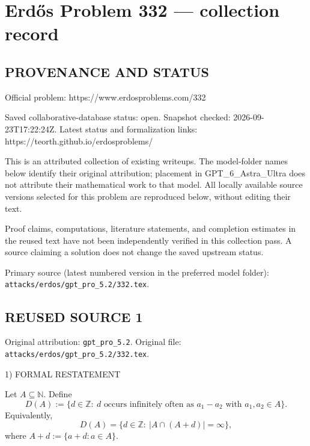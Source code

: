 \section*{Erd\H{o}s Problem 332 --- collection record}

\subsection*{PROVENANCE AND STATUS}
Official problem: https://www.erdosproblems.com/332

Saved collaborative-database status: open.
Snapshot checked: 2026-09-23T17:22:24Z.
Latest status and formalization links: https://teorth.github.io/erdosproblems/

This is an attributed collection of existing writeups. The model-folder names below identify their original attribution; placement in GPT\_6\_Astra\_Ultra does not attribute their mathematical work to that model. All locally available source versions selected for this problem are reproduced below, without editing their text.

Proof claims, computations, literature statements, and completion estimates in the reused text have not been independently verified in this collection pass. A source claiming a solution does not change the saved upstream status.

Primary source (latest numbered version in the preferred model folder): \texttt{attacks/erdos/gpt\_pro\_5.2/332.tex}.

\subsection*{REUSED SOURCE 1}
Original attribution: \texttt{gpt\_pro\_5.2}.
Original file: \texttt{attacks/erdos/gpt\_pro\_5.2/332.tex}.


1) FORMAL RESTATEMENT

Let $A\subseteq\mathbb N$.
Define
\[
D(A):=\{d\in\mathbb Z:\ d\text{ occurs infinitely often as }a_1-a_2\text{ with }a_1,a_2\in A\}.
\]
Equivalently,
\[
D(A)=\{d\in\mathbb Z:\ |A\cap(A+d)|=\infty\},
\]
where $A+d:=\{a+d: a\in A\}$.

